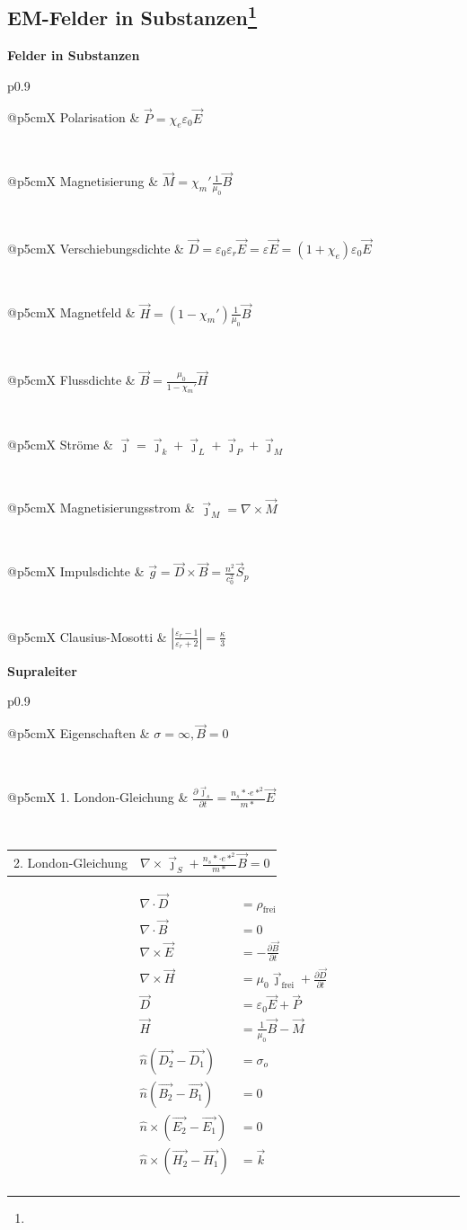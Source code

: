 \documentclass[12pt,a4paper, twoside]{article}
\makeatletter
\newcommand{\abs}[1]{\left| #1 \right|}
\newcommand{\pd}[2]{\frac{\partial #1}{\partial #2}}
\renewcommand{\=}[1]{\stackrel{#1}{=}}
\newcommand{\js}{\vec \jmath}
\theoremstyle{definition}
\theoremstyle{remark}
\newcommand{\concept}[2]{%
\noindent
\begin{framed}
\noindent\textbf{#1}
\par\begin{tabular}{p{0.9\linewidth}}
#2
\end{tabular}
\end{framed}
}
\newcommand{\f}[2]{%
\noindent\begin{tabularx}{\linewidth}{@{}p{5cm}X}
#1 & $#2$
\end{tabularx}}
\makeatother
\begin{document}
\subsection[EM-Felder in Substanzen]{EM-Felder in Substanzen\let\thefootnote\relax\footnote{}}


\concept{Felder in Substanzen}{

\f{Polarisation}{\vec P = \chi_e \varepsilon_0 \vec E}\\
\f{Magnetisierung}{\vec M = \chi_m' \frac{1}{\mu_0} \vec B}\\
\f{Verschiebungsdichte}{\vec D = \varepsilon_0 \varepsilon_r \vec E = \varepsilon \vec E = (1+\chi_e) \varepsilon_0 \vec E}\\
\f{Magnetfeld}{\vec H = (1-\chi_m') \frac{1}{\mu_0} \vec B}\\
\f{Flussdichte}{\vec B = \frac{\mu_0}{1-\chi_m'} \vec H}\\
\f{Ströme}{\js = \js_k + \js_L + \js_P + \js_M}\\
\f{Magnetisierungsstrom}{\js_M = \nabla \times \vec M}\\
\f{Impulsdichte}{\vec g = \vec D \times \vec B = \frac{n^2}{c_0^2} \vec S_p}\\
\f{Clausius-Mosotti}{\abs{\frac{\varepsilon_r - 1}{\varepsilon_r + 2}} = \frac{\kappa}{3}}

}

\concept{Supraleiter}{

\f{Eigenschaften}{\sigma = \infty, \vec B = 0}\\
\f{1. London-Gleichung}{\pd{\js_s}{t} = \frac{n_s* \cdot e*^2}{m*} \vec E}\\
\f{2. London-Gleichung}{\nabla \times \js_S + \frac{n_s* \cdot e*^2}{m*} \vec B = 0}
}

\begin{center}
\begin{framed}
\begin{align*}
\nabla \cdot \vec D &= \rho_{\text{frei}}\\
\nabla \cdot \vec B &= 0\\
\nabla \times \vec E &= - \pd{\vec{B}}{t}\\
\nabla \times \vec H &=  \mu_0 \vec \jmath_{\text{frei}} + \pd{\vec{D}}{t}\\
\vec D &= \varepsilon_0 \vec E + \vec P\\
\vec H &= \frac{1}{\mu_0} \vec B - \vec M\\
\hat n (\vec{D_2} - \vec{D_1}) &= \sigma_o\\
\hat n (\vec{B_2} - \vec{B_1}) &= 0\\
\hat n \times (\vec{E_2} - \vec{E_1}) &= 0\\
\hat n \times (\vec{H_2} - \vec{H_1}) &= \vec k\\
\end{align*}
\end{framed}
\end{center}
\end{document}
